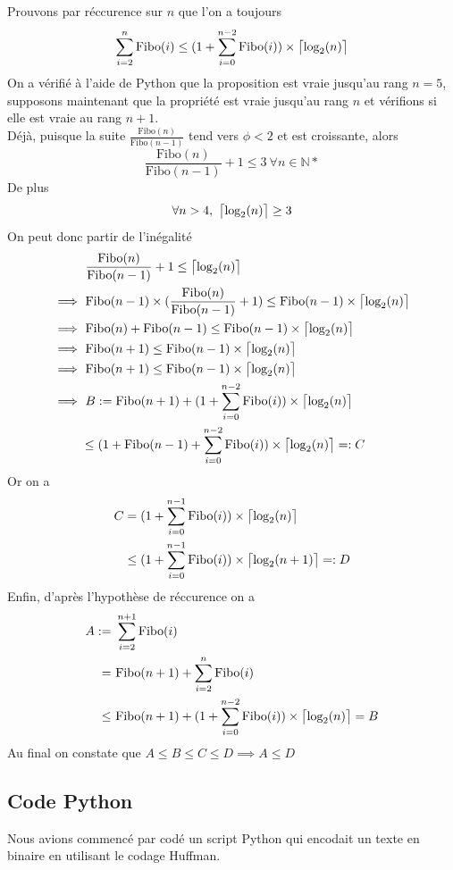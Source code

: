 \documentclass[a4paper, 12pt]{article}
\DeclarePairedDelimiter{\ceil}{\lceil}{\rceil}
\let\qed\square
\begin{document}
Prouvons par réccurence sur $n$ que l'on a toujours
$$
\sum_{i = 2}^n \text{Fibo}(i) \leq (1+\sum_{i = 0}^{n-2}\text{Fibo}(i))\times \ceil[\big]{\text{log}_2(n)}
$$
On a vérifié à l'aide de Python que la proposition est vraie jusqu'au rang $n = 5$, supposons maintenant que la propriété est vraie jusqu'au rang $n$ et vérifions si elle est vraie au rang $n+1$. \\
Déjà, puisque la suite $\frac{\text{Fibo}(n)}{\text{Fibo}(n-1)}$ tend vers $\phi < 2$ et est croissante, alors
$$
\frac{\text{Fibo}(n)}{\text{Fibo}(n-1)}+1 \leq 3\ \forall n \in \mathbb{N*}
$$
De plus
$$
\forall n > 4,\ \ceil[\big]{\text{log}_2(n)} \geq 3
$$
On peut donc partir de l'inégalité
\begin{align*}
&\ \frac{\text{Fibo}(n)}{\text{Fibo}(n-1)}+1 \leq \ceil[\big]{\text{log}_2(n)} \\
\implies&\ \text{Fibo}(n-1)\times(\frac{\text{Fibo}(n)}{\text{Fibo}(n-1)}+1) \leq \text{Fibo}(n-1)\times\ceil[\big]{\text{log}_2(n)} \\
\implies&\ \text{Fibo}(n)+\text{Fibo}(n-1) \leq \text{Fibo}(n-1)\times\ceil[\big]{\text{log}_2(n)} \\
\implies&\ \text{Fibo}(n+1) \leq \text{Fibo}(n-1)\times\ceil[\big]{\text{log}_2(n)} \\
\implies&\ \text{Fibo}(n+1) \leq \text{Fibo}(n-1)\times\ceil[\big]{\text{log}_2(n)} \\
\implies&\ B := \text{Fibo}(n+1)+(1+\sum_{i = 0}^{n-2}\text{Fibo}(i))\times \ceil[\big]{\text{log}_2(n)} \\
&\leq (1+\text{Fibo}(n-1)+\sum_{i = 0}^{n-2}\text{Fibo}(i))\times \ceil[\big]{\text{log}_2(n)} =: C
\end{align*}
Or on a
\begin{align*}
C &= (1+\sum_{i = 0}^{n-1}\text{Fibo}(i))\times \ceil[\big]{\text{log}_2(n)} \\
&\leq (1+\sum_{i = 0}^{n-1}\text{Fibo}(i))\times \ceil[\big]{\text{log}_2(n+1)} =: D
\end{align*}
Enfin, d'après l'hypothèse de réccurence on a
\begin{align*}
A :=&\ \sum_{i = 2}^{n+1} \text{Fibo}(i) \\
=&\ \text{Fibo}(n+1)+\sum_{i = 2}^n \text{Fibo}(i) \\
\leq&\ \text{Fibo}(n+1)+(1+\sum_{i = 0}^{n-2}\text{Fibo}(i))\times \ceil[\big]{\text{log}_2(n)} = B
\end{align*}
Au final on constate que $A \leq B \leq C \leq D \implies A \leq D$ \\
\qed

\subsection{Code Python}
Nous avions commencé par codé un script Python qui encodait un texte en binaire en utilisant le codage Huffman. \\

\end{document}
